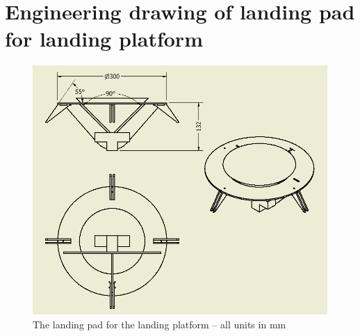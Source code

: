\section{Engineering drawing of landing pad for landing platform}
\begin{figure}
	\centering
	\includegraphics[width=1\textwidth]{imgs/app2_landing_pad_drawing}
	\caption{The landing pad for the landing platform -- all units in \si{\milli\meter}}
\end{figure}